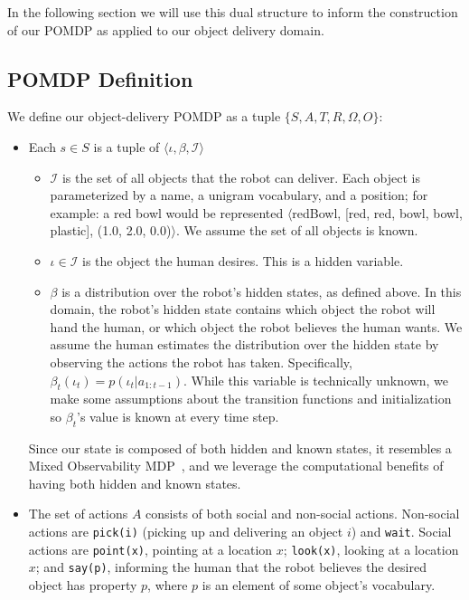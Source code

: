 \documentclass[conference]{IEEEtran}
\newcommand{\Iota}{\mathcal{I}}
\begin{document}
In the following section we will use this dual structure to inform the construction of our POMDP as applied to our object delivery domain. 


\subsection{POMDP Definition}

We define our object-delivery POMDP as a tuple $\{S, A, T, R, \Omega, O\}$: 

\begin{itemize}
	\item Each $s \in S$ is a tuple of $\langle \iota, \beta, \Iota \rangle$		\begin{itemize}
			\item $\Iota$ is the set of all objects that the robot can deliver. Each object is parameterized by a name, a unigram vocabulary, and a position; for example: a red bowl would be represented $\langle$redBowl, [red, red, bowl, bowl, plastic], (1.0, 2.0, 0.0)$\rangle$. We assume the set of all objects is known. 
			\item $\iota \in \Iota$ is the object the human desires. This is a hidden variable. 
			\item $\beta$ is a distribution over the robot's hidden states, as defined above. In this domain, the robot's hidden state contains which object the robot will hand the human, or which object the robot believes the human wants. We assume the human estimates the distribution over the hidden state by observing the actions the robot has taken. Specifically, $\beta_t(\iota_t) = p(\iota_t | a_{1:t-1})$. While this variable is technically unknown, we make some assumptions about the transition functions and initialization so $\beta_t$'s value is known at every time step. 
		\end{itemize}
		Since our state is composed of both hidden and known states, it resembles a Mixed Observability MDP~\citep{momdp}, and we leverage the computational benefits of having both hidden and known states. 
	\item The set of actions $A$ consists of both social and non-social actions. Non-social actions are \texttt{pick(i)} (picking up  and delivering an object $i$) and \texttt{wait}. Social actions are \texttt{point(x)}, pointing at a location $x$; \texttt{look(x)}, looking at a location $x$; and \texttt{say(p)}, informing the human that the robot believes the desired object has property $p$, where $p$ is an element of some object's vocabulary. 

\end{itemize}
\end{document}

